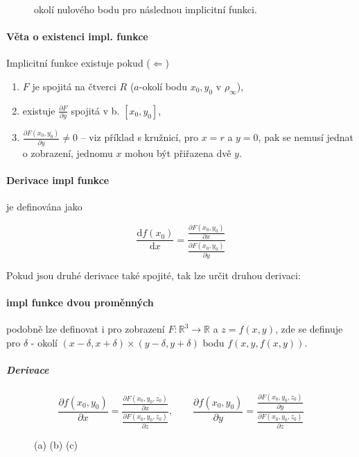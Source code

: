 \documentclass[a4paper, twoside,%
12pt]{article}
\newcommand{\R}{\mathbb{R}}
\newcommand{\pard}[2]{\frac{\partial #1 }{\partial #2 }}
\newcommand{\der}[2]{\frac{\mathrm{d} #1 }{\mathrm{d} #2 }}
\begin{document}
\begin{figure}[]
    \centering
    
    \caption{okolí nulového bodu pro následnou implicitní funkci.}
    \label{fig:implic}
\end{figure}

\paragraph{Věta o existenci impl. funkce} Implicitní funkce existuje pokud ($\Leftarrow$) 
\begin{enumerate}
    \item $F$ je spojitá na čtverci $R$ ($a$-okolí bodu $x_0,y_0$ v $\rho_\infty$),
    \item existuje $\pard{F}{y}$ spojitá v b. $[x_0, y_0]$,
    \item $\pard{F(x_0, y_0)}{y} \neq 0$ -- viz příklad s kružnicí, pro $x=r$ a $y=0$, pak se nemusí jednat o zobrazení, jednomu $x$ mohou být přiřazena dvě $y$.
\end{enumerate}

\paragraph{Derivace impl funkce}
je definována jako 

$$ \der{f(x_0)}{x} = \frac{\pard{F(x_0, y_0)}{x}}{\pard{F(x_0, y_0)}{y}} $$

Pokud jsou druhé derivace také spojité, tak lze určit druhou derivaci:

\paragraph{impl funkce dvou proměnných}
podobně lze definovat i pro zobrazení $F: \R^3 \to \R$ a $z = f(x,y)$, zde se definuje pro $\delta$ - okolí $(x-\delta, x+\delta)\times (y-\delta, y+\delta)$ bodu $f(x,y,f(x,y))$.

\subparagraph{Derivace}
$$\pard{f(x_0,y_0)}{x} = \frac{\pard{F(x_0,y_0, z_0)}{x}}{\pard{F(x_0,y_0, z_0)}{z}},\qquad \pard{f(x_0,y_0)}{y} = \frac{\pard{F(x_0,y_0, z_0)}{y}}{\pard{F(x_0,y_0, z_0)}{z}} $$

\begin{figure}[h]
    \centering
    \begin{subfigure}[b]{7cm}
        
        \caption{}
    \end{subfigure}
    \begin{subfigure}[b]{7cm}
        
        \caption{}
    \end{subfigure}
    \begin{subfigure}[b]{7cm}
        
        \caption{}
    \end{subfigure}
    \caption{(a)  (b) (c) }
    \label{}
\end{figure}
\end{document}
